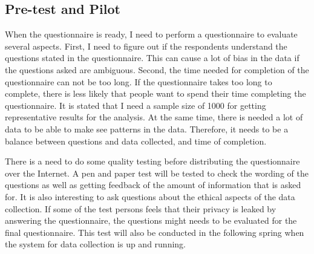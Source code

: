   \subsection{Pre-test and Pilot}\label{sec:pretest}
    When the questionnaire is ready, I need to perform a questionnaire to evaluate several aspects. First, I need to figure out if the respondents understand the questions stated in the questionnaire. This can cause a lot of bias in the data if the questions asked are ambiguous. Second, the time needed for completion of the questionnaire can not be too long. If the questionnaire takes too long to complete, there is less likely that people want to spend their time completing the questionnaire. It is stated that I need a sample size of 1000 for getting representative results for the analysis. At the same time, there is needed a lot of data to be able to make see patterns in the data. Therefore, it needs to be a balance between questions and data collected, and time of completion. 


    There is a need to do some quality testing before distributing the questionnaire over the Internet. A pen and paper test will be tested to check the wording of the questions as well as getting feedback of the amount of information that is asked for. It is also interesting to ask questions about the ethical aspects of the data collection. If some of the test persons feels that their privacy is leaked by answering the questionnaire, the questions might needs to be evaluated for the final questionnaire. 
    This test will also be conducted in the following spring when the system for data collection is up and running. 